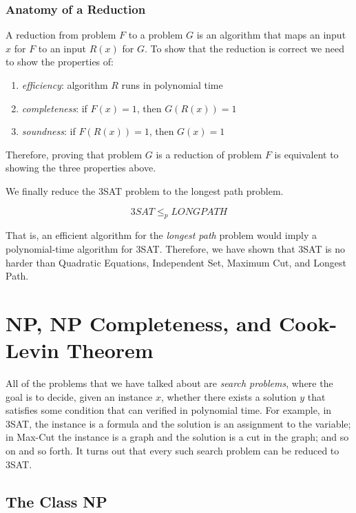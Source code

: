 \subsubsection{Anatomy of a Reduction}

  A reduction from problem $F$ to a problem $G$ is an algorithm that maps an input $x$ for $F$ to an input $R(x)$ for $G$. To show that the reduction is correct we need to show the properties of: 
  \begin{enumerate}
      \item \textit{efficiency}: algorithm $R$ runs in polynomial time
      \item \textit{completeness}: if $F(x) = 1$, then $G(R(x)) = 1$ 
      \item \textit{soundness}: if $F(R(x)) = 1$, then $G(x) = 1$
  \end{enumerate}
  Therefore, proving that problem $G$ is a reduction of problem $F$ is equivalent to showing the three properties above. 

  We finally reduce the 3SAT problem to the longest path problem. 

  \begin{theorem}
  \[3SAT \leq_p LONGPATH\]
  \end{theorem}
  That is, an efficient algorithm for the \textit{longest path} problem would imply a polynomial-time algorithm for 3SAT. Therefore, we have shown that 3SAT is no harder than Quadratic Equations, Independent Set, Maximum Cut, and Longest Path. 

\section{NP, NP Completeness, and Cook-Levin Theorem}

  All of the problems that we have talked about are \textit{search problems}, where the goal is to decide, given an instance $x$, whether there exists a solution $y$ that satisfies some condition that can verified in polynomial time. For example, in 3SAT, the instance is a formula and the solution is an assignment to the variable; in Max-Cut the instance is a graph and the solution is a cut in the graph; and so on and so forth. It turns out that every such search problem can be reduced to 3SAT. 

\subsection{The Class NP}

